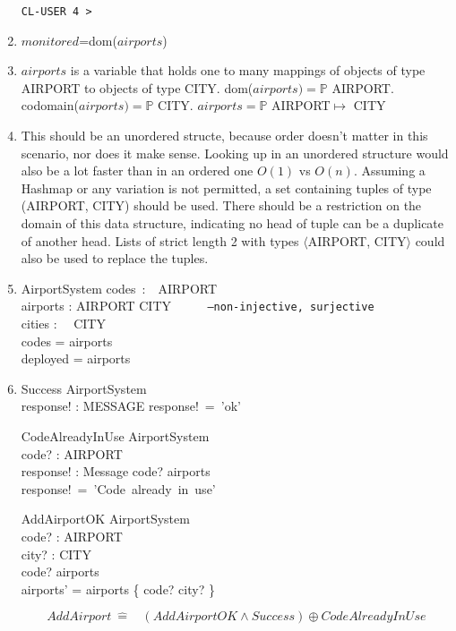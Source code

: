 \documentclass[12pt]{article}
\begin{document}
\begin{enumerate}
\begin{verbatim}
CL-USER 4 > 
\end{verbatim}
\item $monitored$=dom($airports$)
\item $airports$ is a variable that holds one to many mappings of objects of type AIRPORT to objects of type CITY. dom($airports)=\mathbb{P}$ AIRPORT. codomain($airports)= \mathbb{P}$ CITY. $airports = \mathbb{P}$ AIRPORT$\mapsto$ CITY
\item This should be an unordered structe, because order doesn't matter in this scenario, nor does it make sense. Looking up in an unordered structure would also be a lot faster than in an ordered one $O(1)$ vs $O(n)$. Assuming a Hashmap or any variation is not permitted, a set containing tuples of type (AIRPORT, CITY) should be used. There should be a restriction on the domain of this data structure, indicating no head of tuple can be a duplicate of another head. Lists of strict length 2 with types $\langle$AIRPORT, CITY$\rangle$ could also be used to replace the tuples.
\newpage
\item 
\begin{schema}{AirportSystem}
codes~:~~AIRPORT\\
airports : AIRPORT \rightarrow CITY \texttt{~~~~~--non-injective, surjective}\\
cities : ~~CITY\\
\where
codes = \dom airports\\
deployed = \ran airports
\end{schema}
\item
\begin{schema}{Success}
\Xi AirportSystem\\
response! : MESSAGE
\where
response!~=~'ok'\\
\end{schema}
\begin{schema}{CodeAlreadyInUse}
\Xi AirportSystem\\
code? : AIRPORT\\
response! : Message
\ST
code? \in \dom airports\\
response!~=~'Code~already~in~use'
\end{schema}

\begin{schema}{AddAirportOK}
\Delta AirportSystem\\
code? : AIRPORT\\
city? : CITY\\
\where
code? \notin \dom airports\\
airports' = airports \cup \{ code? \mapsto city? \}\\
\end{schema}
\[ AddAirport~\hat{=}~~~~(AddAirportOK\wedge Success) \oplus CodeAlreadyInUse\]
\end{enumerate}
\end{document}

